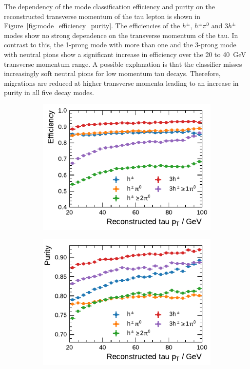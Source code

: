 The dependency of the mode classification efficiency and purity on the
reconstructed transverse momentum of the tau lepton is shown in
Figure~\ref{fig:mode_efficiency_purity}. The efficiencies of the $h^\pm$,
$h^\pm \pi^0$ and $3h^\pm$ modes show no strong dependence on the transverse
momentum of the tau. In contrast to this, the 1-prong mode with more than one
and the 3-prong mode with neutral pions show a significant increase in
efficiency over the \num{20} to \SI{40}{\GeV} transverse momentum range. A
possible explanation is that the classifier misses increasingly soft neutral
pions for low momentum tau decays. Therefore, migrations are reduced at higher
transverse momenta leading to an increase in purity in all five decay modes.

\begin{figure}[htb]
  \begin{subfigure}{0.48\textwidth}
    \centering
    \includegraphics{./figures/decay_mode_classification/combined_sub_e_moments_shots_conv_ptcut_1_5/efficiency_profile.pdf}
    \vspace*{-1.6em}
    \subcaption{}
  \end{subfigure}\hfill
  \begin{subfigure}{0.48\textwidth}
    \centering
    \includegraphics{./figures/decay_mode_classification/combined_sub_e_moments_shots_conv_ptcut_1_5/purity_profile.pdf}

\end{subfigure}
\end{figure}
